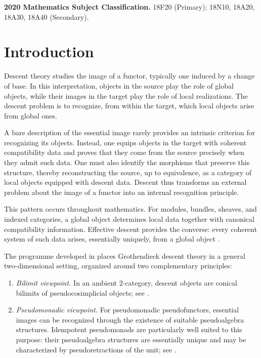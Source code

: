 \documentclass[11pt,a4paper]{article}
\numberwithin{equation}{section}
\theoremstyle{definition}
\theoremstyle{remark}
\begin{document}
\smallskip
\noindent\textbf{2020 Mathematics Subject Classification.}
18F20 (Primary); 18N10, 18A20, 18A30, 18A40 (Secondary).

\section{Introduction}
\label{sec:introduction}
Descent theory studies the image of a functor, typically one induced
by a change of base. In this interpretation, objects in the source
play the role of global objects, while their images in the target play
the role of local realizations. The descent problem is to recognize,
from within the target, which local objects arise from global ones.

A bare description of the essential image rarely provides an
intrinsic criterion for recognizing its objects. Instead, one equips
objects in the target with coherent compatibility data and proves that
they come from the source precisely when they admit such data. One
must also identify the morphisms that preserve this structure, thereby
reconstructing the source, up to equivalence, as a category of local
objects equipped with descent data. Descent thus transforms an
external problem about the image of a functor into an internal
recognition principle.

This pattern occurs throughout mathematics. For modules, bundles,
sheaves, and indexed categories, a global object determines local data
together with canonical compatibility information. Effective descent
provides the converse: every coherent system of such data arises,
essentially uniquely, from a global object
\cite{Grothendieck1960,Grothendieck1971,Giraud1964,JanelidzeTholen1994}.

The programme developed in \cite{Nunes2018} places Grothendieck
descent theory in a general two-dimensional setting, organized around
two complementary principles:
\begin{enumerate}
  \item \emph{Bilimit viewpoint.} In an ambient \(2\)-category,
  descent objects are conical bilimits of pseudocosimplicial objects;
  see \cite[Theorem~4.11]{Nunes2018}.

  \item \emph{Pseudomonadic viewpoint.} For pseudomonadic
  pseudofunctors, essential images can be recognized through the
  existence of suitable pseudoalgebra structures. Idempotent
  pseudomonads are particularly well suited to this purpose: their
  pseudoalgebra structures are essentially unique and may be
  characterized by pseudoretractions of the unit; see
  \cite[Section~2]{Nunes2018}.
\end{enumerate}
\end{document}
